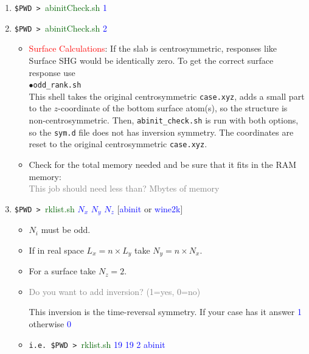 \documentclass[openany,oneside]{book}
\numberwithin{equation}{section}
\begin{document}
\begin{enumerate}
\begin{itemize}
\end{itemize}
\item \verb=$PWD > =\textcolor{darkgreen}{abinitCheck.sh} \textcolor{blue}{1} 
\item \verb=$PWD > =\textcolor{darkgreen}{abinitCheck.sh} \textcolor{blue}{2} 
\begin{itemize}
\item \textcolor{red}{Surface Calculations}: If the slab is
  centrosymmetric, responses like  Surface SHG would be identically
  zero. To get the correct surface response use\\
$\bullet$\verb=odd_rank.sh=\\
This shell takes the original centrosymmetric \verb=case.xyz=, adds a
small part to the $z$-coordinate of the bottom surface atom(s), so the
structure is non-centrosymmetric. 
Then, \verb=abinit_check.sh= is run with both options, so the
\verb=sym.d= file does not has inversion symmetry.  
The coordinates are reset to the original centrosymmetric \verb=case.xyz=.  
\item Check for the total memory needed and be sure that it fits in the RAM memory:\\
\textcolor{gray}{This job should need less than\hfill ? Mbytes of memory}
\end{itemize}
\item \verb=$PWD > =\textcolor{darkgreen}{rklist.sh}
\textcolor{blue}{ $N_x$ $N_y$ $N_z$} [\textcolor{blue}{abinit} or \textcolor{blue}{wine2k}]
\begin{itemize}

\item {\small $N_i$ must be odd.}
\item {\small If in real space $L_x=n\times L_y$ take
$N_y= n\times N_x$.}
\item {\small For a surface take $N_z=2$.}
\item 
\textcolor{gray}{Do you want to add inversion? (1=yes, 0=no)}

This inversion is the time-reversal symmetry. If your case has
it answer \textcolor{blue}{1} 
otherwise \textcolor{blue}{0} 

\item{\small \verb=i.e. $PWD > =\textcolor{darkgreen}{rklist.sh}
\textcolor{blue}{ 19 19 2 abinit}

}
\end{itemize}
\end{enumerate}
\end{document}

